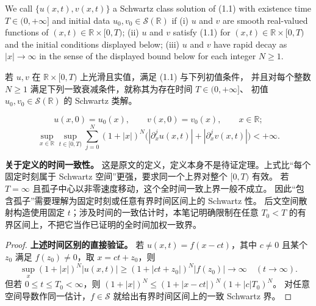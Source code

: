\begin{paperdefinitionen}\label{def:1.1}
We call $\{u(x,t),v(x,t)\}$ a Schwartz class solution of (1.1) with existence time $T\in(0,+\infty]$ and initial data $u_0,v_0\in\mathcal S(\mathbb R)$ if
(i) $u$ and $v$ are smooth real-valued functions of $(x,t)\in\mathbb R\times[0,T)$;
(ii) $u$ and $v$ satisfy (1.1) for $(x,t)\in\mathbb R\times[0,T)$ and the initial conditions displayed below;
(iii) $u$ and $v$ have rapid decay as $|x|\to\infty$ in the sense of the displayed bound below for each integer $N\ge1$.
\end{paperdefinitionen}
\begin{paperdefinitioncn*}
若 $u,v$ 在 $\mathbb R\times\lbrack0,T)$ 上光滑且实值，满足 (1.1) 与下列初值条件，
并且对每个整数 $N\ge1$ 满足下列一致衰减条件，就称其为存在时间 $T\in(0,+\infty]$、
初值 $u_0,v_0\in\mathcal S(\mathbb R)$ 的 Schwartz 类解。
\end{paperdefinitioncn*}
\[
u(x,0)=u_0(x),\qquad v(x,0)=v_0(x),\qquad x\in\mathbb R;
\]
\[
\sup_{x\in\mathbb R}\sup_{t\in\lbrack0,T)}
\sum\limits_{j=0}^N(1+|x|)^N
\bigl(|\partial_x^ju(x,t)|+|\partial_x^jv(x,t)|\bigr)<+\infty.
\]
\begin{note}
\textbf{关于定义的时间一致性。}
这是原文的定义，定义本身不是待证定理。上式比“每个固定时刻属于 Schwartz 空间”更强，要求同一个上界对整个 $\lbrack0,T)$ 有效。
若 $T=\infty$ 且孤子中心以非零速度移动，这个全时间一致上界一般不成立。
因此“包含孤子”需要理解为固定时刻或任意有界时间区间上的 Schwartz 性。
后文空间散射构造使用固定 $t$；涉及时间的一致估计时，本笔记明确限制在任意 $T_0<T$ 的有界区间上，不把它当作已证明的全时间加权一致界。
\end{note}
\begin{proof}
\textbf{上述时间区别的直接验证。}
若 $u(x,t)=f(x-ct)$，其中 $c\ne0$ 且某个 $z_0$ 满足 $f(z_0)\ne0$，取 $x=ct+z_0$，则
\[
\sup_x(1+|x|)^N|u(x,t)|
\ge (1+|ct+z_0|)^N|f(z_0)|\longrightarrow\infty
\quad(t\to\infty).
\]
但若 $0\le t\le T_0<\infty$，则
$(1+|x|)^N\le(1+|x-ct|)^N(1+|c|T_0)^N$。
对任意空间导数作同一估计，$f\in\mathcal S$ 就给出有界时间区间上的一致 Schwartz 界。
\end{proof}

